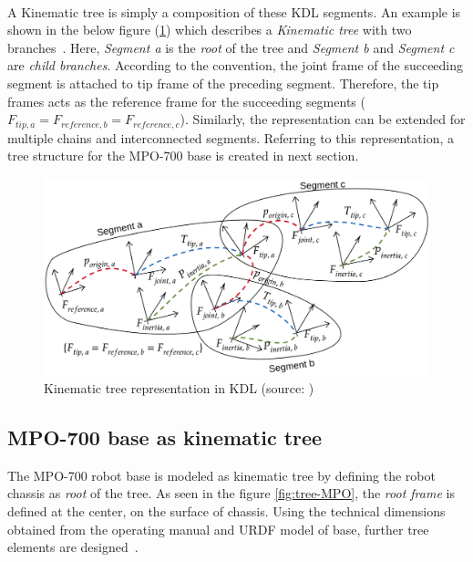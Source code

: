 \paragraph{}A Kinematic tree is simply a composition of these KDL segments. An example is shown in the below figure (\ref{fig:kinematic-tree}) which describes a \textit{Kinematic tree} with two branches~\cite{kinematictreeKDL}. Here, \textit{Segment a} is the \textit{root} of the tree and \textit{Segment b} and \textit{Segment c} are \textit{child branches}. According to the convention, the joint frame of the succeeding segment is attached to tip frame of the preceding segment. Therefore, the tip frames acts as the reference frame for the succeeding segments ($F_{tip, a} = F_{reference, b} = F_{reference, c}$). Similarly, the representation can be extended for multiple chains and interconnected segments. Referring to this representation, a tree structure for the MPO-700 base is created in next section.

\begin{figure}[h]
	\includegraphics[scale=0.36]{images/kinematic-tree}
	\caption{Kinematic tree representation in KDL (source: \cite{kinematictreeKDL})}
	\label{fig:kinematic-tree}
\end{figure}

\newpage
\subsection{MPO-700 base as kinematic tree}
The MPO-700 robot base is modeled as kinematic tree by defining the robot chassis as \textit{root} of the tree. As seen in the figure \ref{fig:tree-MPO}, the \textit{root frame} is defined at the center, on the surface of chassis. Using the technical dimensions obtained from the operating manual and URDF model of base, further tree elements are designed~\cite{MPO700}. 

